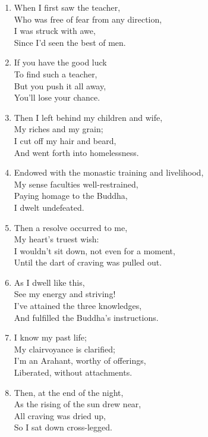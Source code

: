 \documentclass[10pt, openany]{book}
\begin{document}
\begin{enumerate}
\item When I first saw the teacher,\\
Who was free of fear from any direction,\\
I was struck with awe,\\
Since I’d seen the best of men.

\item If you have the good luck\\
To find such a teacher,\\
But you push it all away,\\
You’ll lose your chance.

\item Then I left behind my children and wife,\\
My riches and my grain;\\
I cut off my hair and beard,\\
And went forth into homelessness.

\item Endowed with the monastic training and livelihood,\\
My sense faculties well-restrained,\\
Paying homage to the Buddha,\\
I dwelt undefeated.

\item Then a resolve occurred to me,\\
My heart’s truest wish:\\
I wouldn’t sit down, not even for a moment,\\
Until the dart of craving was pulled out.

\item As I dwell like this,\\
See my energy and striving!\\
I’ve attained the three knowledges,\\
And fulfilled the Buddha’s instructions.

\item I know my past life;\\
My clairvoyance is clarified;\\
I’m an Arahant, worthy of offerings,\\
Liberated, without attachments.

\item Then, at the end of the night,\\
As the rising of the sun drew near,\\
All craving was dried up,\\
So I sat down cross-legged.


\end{enumerate}
\end{document}
